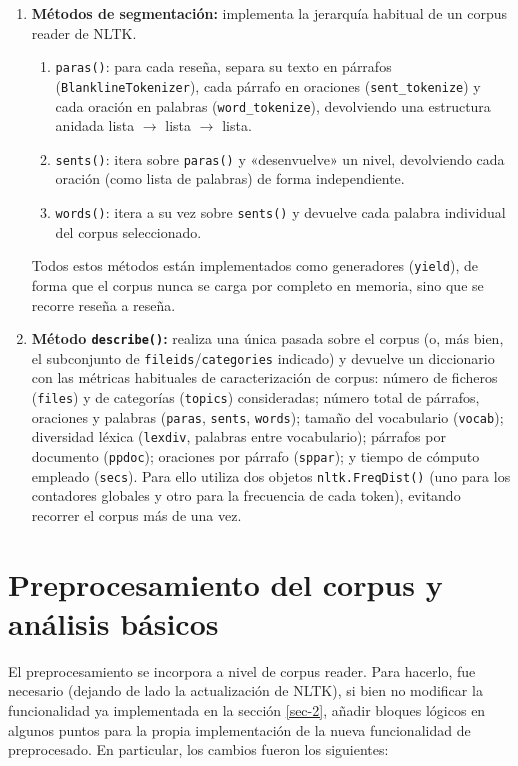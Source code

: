 \documentclass[10pt,a4paper]{article}
\begin{document}
\begin{enumerate}
    \item \textbf{Métodos de segmentación:} implementa la jerarquía habitual de un corpus reader de NLTK.
    \begin{enumerate}
        \item \texttt{paras()}: para cada reseña, separa su texto en párrafos (\texttt{BlanklineTokenizer}), cada párrafo en 
        oraciones (\texttt{sent\_tokenize}) y cada oración en palabras (\texttt{word\_tokenize}), devolviendo una estructura 
        anidada lista $\to$ lista $\to$ lista.
        \item \texttt{sents()}: itera sobre \texttt{paras()} y «desenvuelve» un nivel, devolviendo cada oración (como lista de 
        palabras) de forma independiente.
        \item \texttt{words()}: itera a su vez sobre \texttt{sents()} y devuelve cada palabra individual del corpus seleccionado.
    \end{enumerate}
    Todos estos métodos están implementados como generadores (\texttt{yield}), de forma que el corpus nunca se carga por completo 
    en memoria, sino que se recorre reseña a reseña.

    \item \textbf{Método \texttt{describe()}:} realiza una única pasada sobre el corpus (o, más bien, el subconjunto de 
    \texttt{fileids}/\texttt{categories} indicado) y devuelve un diccionario con las métricas habituales de caracterización 
    de corpus: número de ficheros (\texttt{files}) y de categorías (\texttt{topics}) consideradas; número total de párrafos, 
    oraciones y palabras (\texttt{paras}, \texttt{sents}, \texttt{words}); tamaño del vocabulario (\texttt{vocab}); diversidad 
    léxica (\texttt{lexdiv}, palabras entre vocabulario); párrafos por documento (\texttt{ppdoc}); oraciones por párrafo 
    (\texttt{sppar}); y tiempo de cómputo empleado (\texttt{secs}). Para ello utiliza dos objetos \texttt{nltk.FreqDist()} 
    (uno para los contadores globales y otro para la frecuencia de cada token), evitando recorrer el corpus más de una vez.
\end{enumerate}

\newpage

\section{Preprocesamiento del corpus y análisis básicos}
\label{sec-3}

\noindent El preprocesamiento se incorpora a nivel de corpus reader. Para hacerlo, fue necesario (dejando de lado la actualización 
de NLTK), si bien no modificar la funcionalidad ya implementada en la sección \ref{sec-2}, añadir bloques lógicos en algunos puntos
para la propia implementación de la nueva funcionalidad de preprocesado. En particular, los cambios fueron los siguientes:
\end{document}

